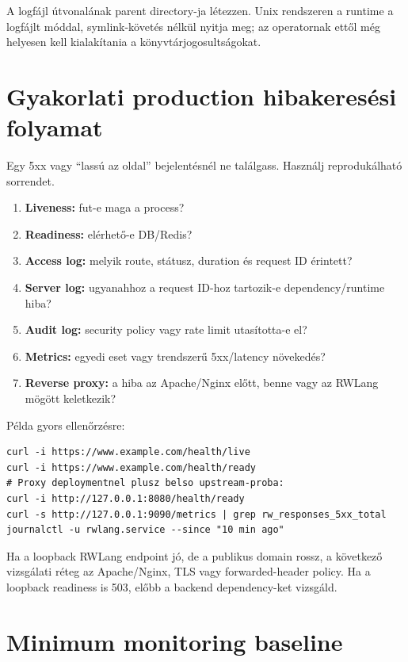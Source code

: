 A logfájl útvonalának parent directory-ja létezzen. Unix rendszeren a runtime a logfájlt  móddal, symlink-követés nélkül nyitja meg; az operatornak ettől még helyesen kell kialakítania a könyvtárjogosultságokat.

\section{Gyakorlati production hibakeresési folyamat}

Egy 5xx vagy ``lassú az oldal'' bejelentésnél ne találgass. Használj reprodukálható sorrendet.

\begin{enumerate}
  \item \textbf{Liveness:} fut-e maga a process?
  \item \textbf{Readiness:} elérhető-e DB/Redis?
  \item \textbf{Access log:} melyik route, státusz, duration és request ID érintett?
  \item \textbf{Server log:} ugyanahhoz a request ID-hoz tartozik-e dependency/runtime hiba?
  \item \textbf{Audit log:} security policy vagy rate limit utasította-e el?
  \item \textbf{Metrics:} egyedi eset vagy trendszerű 5xx/latency növekedés?
  \item \textbf{Reverse proxy:} a hiba az Apache/Nginx előtt, benne vagy az RWLang mögött keletkezik?
\end{enumerate}

Példa gyors ellenőrzésre:

\begin{lstlisting}
curl -i https://www.example.com/health/live
curl -i https://www.example.com/health/ready
# Proxy deploymentnel plusz belso upstream-proba:
curl -i http://127.0.0.1:8080/health/ready
curl -s http://127.0.0.1:9090/metrics | grep rw_responses_5xx_total
journalctl -u rwlang.service --since "10 min ago"
\end{lstlisting}

Ha a loopback RWLang endpoint jó, de a publikus domain rossz, a következő vizsgálati réteg az Apache/Nginx, TLS vagy forwarded-header policy. Ha a loopback readiness is 503, előbb a backend dependency-ket vizsgáld.

\section{Minimum monitoring baseline}

